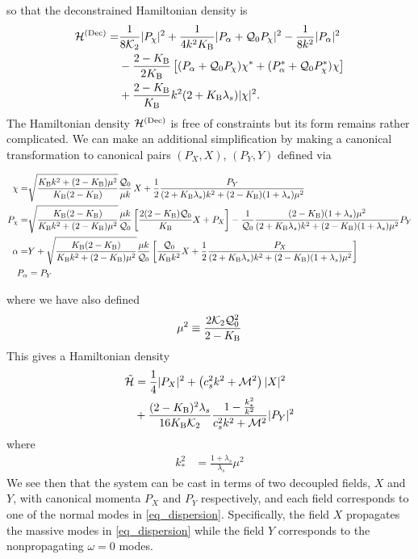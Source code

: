 \documentclass[twocolumn,prd,preprintnumbers,amsmath,amssymb,nofootinbib,superscriptaddress]{revtex4-1}
\newcommand{\lambdas}{\lambda_s}
\newcommand{\Kcal}{{\cal K}}
\newcommand{\Mcal}{{\cal M}}
\newcommand{\Qcal}{{\cal Q}}
\newcommand{\Hcal}{{\cal H}}
\newcommand{\KB}{\ensuremath{K_{{\rm B}}}}
\begin{document}
so that the deconstrained Hamiltonian density is
\begin{align}
\Hcal^{({\rm Dec})} =&  
 \frac{1}{8\Kcal_2} |P_\chi|^2
+ \frac{1}{4k^2 \KB}   | P_\alpha + \Qcal_0 P_\chi |^2 
- \frac{1}{8 k^2}   |P_\alpha|^2
\nonumber
\\
&
- \frac{2-\KB}{2\KB} \left[(P_\alpha + \Qcal_0 P_\chi ) \chi^*  + ( P_\alpha^* + \Qcal_0 P_\chi^*   )    \chi\right]
\nonumber
\\
&
+ \frac{2-\KB}{\KB}  k^2 (2+\KB \lambdas) |\chi|^2.
\label{scalar_Hamiltonian_deconstrained}
\end{align}
The Hamiltonian density $\Hcal^{({\rm Dec})}$ is free of constraints but its form remains rather complicated. 
We can make an additional simplification by making a canonical transformation to canonical pairs $(P_{X},X)$, $(P_{Y},Y)$ defined via
\begin{widetext}
\begin{align}
\chi =&  \sqrt{\frac{ \KB k^2  + (2-\KB) \mu^2 }{\KB(2-\KB) }}\frac{\Qcal_0}{\mu k} \, X  +  \frac{1}{2} \frac{P_Y}{ (2 +\KB \lambdas) k^2 +(2-\KB) (1+\lambdas) \mu^2}
\label{eq_chi_X_P_Y}
\\
P_\chi  =& \sqrt{\frac{\KB(2-\KB)}{\KB k^2  + (2-\KB) \mu^2}} \frac{\mu k}{\Qcal_0}\left[  \frac{2(2-\KB) \Qcal_0 }{\KB} X  + P_X  \right] 
- \frac{1}{\Qcal_0} \frac{ (2-\KB) (1+\lambdas) \mu^2  }{ (2+\KB \lambdas)k^2 + (2-\KB) (1+\lambdas) \mu^2 }  P_Y  
\\
\alpha =& Y +  \sqrt{\frac{\KB(2-\KB)}{\KB k^2  + (2-\KB) \mu^2}} \frac{\mu k}{\Qcal_0} 
 \left[ \frac{\Qcal_0}{\KB k^2} X + \frac{1}{2} \frac{P_X}{ (2+\KB \lambdas)k^2 + (2-\KB) (1+\lambdas) \mu^2 } \right]
\\
P_{\alpha}  &=  P_Y 
\end{align}
\end{widetext}
where we have also  defined
\begin{align}
\mu^2 \equiv \frac{2 \Kcal_2 \Qcal_0^2 }{2 - \KB}
\end{align}
This gives a Hamiltonian  density
\begin{align}
\tilde{\Hcal} &= \frac{1}{4} |P_X|^2 + \left(c_s^2 k^2 + \Mcal^2\right) |X|^2 
\nonumber 
\\
& + \frac{(2-\KB)^2 \lambdas}{16 \KB \Kcal_2 } \frac{1 - \frac{k_*^2}{k^2}}{  c_s^2 k^2 + \Mcal^2 } |P_Y|^2
\label{Ham_tilde}
\end{align}
where
\begin{align}
k_*^2 &=  \frac{1+\lambdas}{\lambdas} \mu^2
\label{eq_k_star}
\end{align}
We see then that the system can be cast in terms of two decoupled fields, $X$ and $Y$, with canonical momenta $P_X$ and $P_Y$ respectively,
and each field corresponds to one of the normal modes in \eqref{eq_dispersion}. Specifically,
the field $X$ propagates the massive modes in \eqref{eq_dispersion} while the field $Y$ corresponds to the nonpropagating $\omega=0$ modes.
\end{document}
